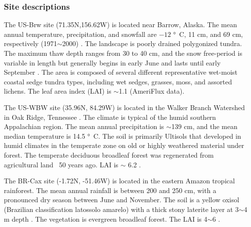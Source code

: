 \documentclass[gmd, manuscript]{copernicus}
\begin{document}
\subsubsection{Site descriptions}
The US-Brw site (71.35N,156.62W) is located near Barrow, Alaska. The mean annual
temperature, precipitation, and snowfall are $-12$ \unit{\degree C}, 11 cm, and
69 cm, respectively (1971$\sim$2000) \citep{Lara2012}. The landscape is poorly
drained polygonized tundra. The maximum thaw depth ranges from 30 to 40 cm, and the
snow free-period is variable in length but generally begins in early June and
lasts until early September \citep{Hinkel2003}. The area is composed of several
different representative wet-moist coastal sedge tundra types, including wet
sedges, grasses, moss, and assorted lichens. The leaf area index (LAI) is
$\sim$1.1 (AmeriFlux data).

The US-WBW site (35.96N, 84.29W) is located in the Walker Branch Watershed in
Oak Ridge, Tennessee \citep{Hanson2003}. The climate is typical of the humid
southern Appalachian region. The mean annual precipitation is $\sim$139 cm, and
the mean median temperature is 14.5 \unit{\degree C}.  
The soil is primarily Ultisols that developed in humid climates in the
temperate zone on old or highly weathered material under forest. The temperate
deciduous broadleaf forest was regenerated from agricultural land ~50 years ago.
LAI is $\sim$ 6.2 \citep{Hanson2004}.

The BR-Cax site (-1.72N, -51.46W) is located in the eastern Amazon tropical
rainforest. The mean annual rainfall is between 200 and 250 \unit{cm}, with a
pronounced dry season between June and November. The soil is a yellow oxisol
(Brazilian classification latossolo amarelo) with a thick stony laterite layer
at 3$\sim$4 m depth \citep{daCosta2010}. The vegetation is evergreen
broadleaf forest. The LAI is 4$\sim$6 \citep{Powell2013}. 
\end{document}
